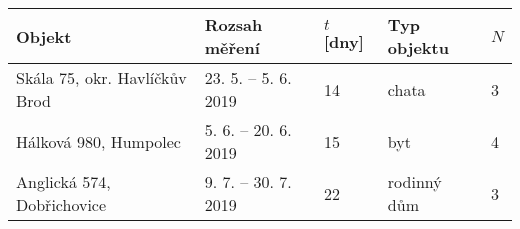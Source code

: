 	\begin{tabular}{lllll}
		\toprule
		Objekt & Rozsah měření & $t$ [dny] & Typ objektu &$N$\\
		\midrule
		Skála 75, okr. Havlíčkův Brod & 23. 5. -- 5. 6. 2019 & 14 & chata & 3\\
		Hálková 980, Humpolec & 5. 6. -- 20. 6. 2019 & 15 & byt & 4\\
		Anglická 574, Dobřichovice & 9. 7. -- 30. 7. 2019 & 22 & rodinný dům & 3\\
		\bottomrule
	\end{tabular}
